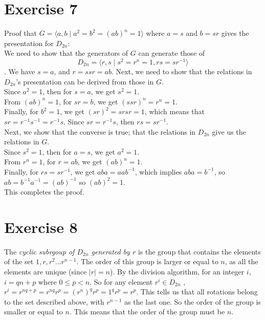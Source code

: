 \documentclass{article}
\begin{document}
    
    \section*{Exercise 7}
    Proof that
    $G = \langle a, b \mid a^2 = b^2 = (ab)^n = 1 \rangle$
    where $a = s$ and $b = sr$ gives the presentation for $D_{2n}$: \\
    We need to show that the generators of $G$ can generate those of
    \[D_{2n} = \langle r, s \mid s^2 = r^n = 1, rs = sr^{-1} \rangle\].
    We have $s = a$, and $r = ssr = ab$.
    Next, we need to show that the relations in $D_{2n}$'s presentation
    can be derived from those in $G$. \\
    Since $a^2 = 1$, then for $s = a$,
    we get $s^2 = 1$. \\
    From $(ab)^n = 1$, for $sr = b$,
    we get $(ssr)^n = r^n = 1$. \\
    Finally, for $b^2 = 1$,
    we get $(sr)^2 = srsr = 1$, which means that $sr = r^{-1}s^{-1} = r^{-1}s$.
    Since $sr = r^{-1}s$, then $rs = sr^{-1}$. \\
    Next, we show that the converse is true;
    that the relations in $D_{2n}$ give us the relations in $G$. \\
    Since $s^2 = 1$, then for $a = s$,
    we get $a^2 = 1$. \\
    From $r^n = 1$, for $r = ab$,
    we get $(ab)^n = 1$. \\
    Finally, for $rs = sr^{-1}$,
    we get $aba = aab^{-1}$,
    which implies $aba = b^{-1}$,
    so $ab = b^{-1}a^{-1} = (ab)^{-1}$
    so $(ab)^2 = 1$. \\
    This completes the proof.


    \section*{Exercise 8}
    The \textit{cyclic subrgoup of $D_{2n}$ generated by $r$} is the group
    that contains the elements of the set ${1, r, r^2 ... r^{n-1}}$.
    The order of this group is larger or equal to $n$,
    as all the elements are unique (since $|r| = n$).
    By the division algorithm, for an integer $i$, $i = qn + p$
    where $0 \leqslant p < n$.
    So for any element $r^i \in D_{2n}$ ,
    $r^i = r^{nq + p} = r^{nq}r^p = (r^n)^qr^p = 1^qr^p = r^p$.
    This tells us that all rotations belong to the set described above,
    with $r^{n-1}$ as the last one.
    So the order of the group is smaller or equal to $n$.
    This means that the order of the group must be $n$.
    
\end{document}
